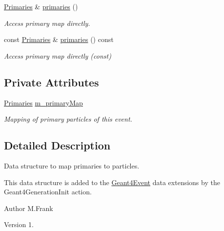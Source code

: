 \begin{DoxyCompactItemize}
\hyperlink{class_d_d4hep_1_1_simulation_1_1_geant4_primary_map_aec80e9bb254e582ef410dc65da5809c3}{Primaries} \& \hyperlink{class_d_d4hep_1_1_simulation_1_1_geant4_primary_map_a3c59e375ae3f9c00b5924a627cf73241}{primaries} ()
\begin{DoxyCompactList}\small\item\em Access primary map directly. \end{DoxyCompactList}\item 
const \hyperlink{class_d_d4hep_1_1_simulation_1_1_geant4_primary_map_aec80e9bb254e582ef410dc65da5809c3}{Primaries} \& \hyperlink{class_d_d4hep_1_1_simulation_1_1_geant4_primary_map_a87d0e953580bc2dd2bd93a7db086bdb6}{primaries} () const
\begin{DoxyCompactList}\small\item\em Access primary map directly (const) \end{DoxyCompactList}\end{DoxyCompactItemize}
\subsection*{Private Attributes}
\begin{DoxyCompactItemize}
\item 
\hyperlink{class_d_d4hep_1_1_simulation_1_1_geant4_primary_map_aec80e9bb254e582ef410dc65da5809c3}{Primaries} \hyperlink{class_d_d4hep_1_1_simulation_1_1_geant4_primary_map_aa3b3cffcec11c5ced24ca4f9ac4e6bde}{m\+\_\+primary\+Map}
\begin{DoxyCompactList}\small\item\em Mapping of primary particles of this event. \end{DoxyCompactList}\end{DoxyCompactItemize}


\subsection{Detailed Description}
Data structure to map primaries to particles. 

This data structure is added to the \hyperlink{class_d_d4hep_1_1_simulation_1_1_geant4_event}{Geant4\+Event} data extensions by the Geant4\+Generation\+Init action.

\begin{DoxyAuthor}{Author}
M.\+Frank 
\end{DoxyAuthor}
\begin{DoxyVersion}{Version}
1. 
\end{DoxyVersion}


